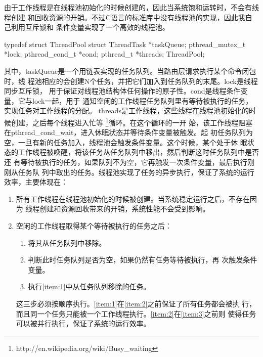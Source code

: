 由于工作线程是在线程池初始化的时候创建的，因此当系统饱和运转时，不会有线程创建
和回收资源的开销。不过C语言的标准库中没有线程池的实现，因此我自己利用互斥锁和
条件变量实现了一个高效的线程池。
\begin{code}
typedef struct ThreadPool {
  struct ThreadTask *taskQueue;
  pthread_mutex_t *lock;
  pthread_cond_t *cond;
  pthread_t *threads;
} ThreadPool;
\end{code}
其中，taskQueue是一个用链表实现的任务队列。当路由层请求执行某个命令闭包时，线
程池相应的会创建N个任务，并把它们加入到任务队列的末尾。lock是线程同步互斥锁，
用于保证对线程池结构体任何操作的原子性。cond是线程条件变量，它与lock一起，用于
通知空闲的工作线程任务队列里有等待被执行的任务，实现任务对工作线程的分配。
threads是工作线程，这些线程在线程池初始化的时候创建，之后每个线程进入忙等
\footnote{http://en.wikipedia.org/wiki/Busy\_waiting}循环。在这个循环的一开
始，该工作线程阻塞在pthread\_cond\_wait，进入休眠状态并等待条件变量被触发。起
初任务队列为空，一旦有新的任务加入，线程池会触发条件变量。这个时候，某个处于休
眠状态的工作线程被唤醒，将该任务从任务队列中移出，然后判断这时任务队列中是否还
有等待被执行的任务，如果队列不为空，它再触发一次条件变量，最后执行刚刚从任务队
列中取出的任务。线程池实现了任务的异步执行，保证了系统的运行效率，主要体现在：
\begin{enumerate}
  \item 所有工作线程在线程池初始化的时候被创建。当系统稳定运行之后，不存在因为
  线程创建和资源回收带来的开销，系统性能不会受到影响。
  \item 空闲的工作线程取得某个等待被执行的任务之后：
  \begin{enumerate}
    \item\label{item:1} 将其从任务队列中移除。
    \item\label{item:2} 判断此时任务队列是否为空，如果仍然有任务等待被执行，再
    次触发条件变量。
    \item\label{item:3} 执行\ref{item:1}中从任务队列移除的任务。
  \end{enumerate}
  这三步必须按顺序执行。\ref{item:1}在\ref{item:2}之前保证了所有任务都会被执
  行，而且同一个任务只能被一个工作线程执行。\ref{item:2}在\ref{item:3}之前则
  使得任务可以被并行执行，保证了系统的运行效率。
\end{enumerate}

